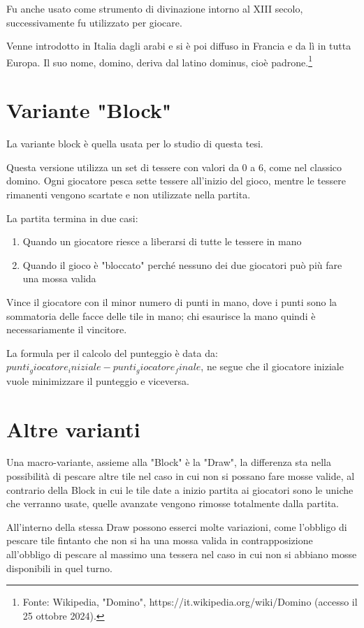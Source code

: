 \documentclass[a4paper.12pt]{report} %
\begin{document}
Fu anche usato come strumento di divinazione intorno al XIII secolo, successivamente fu utilizzato per giocare. 

Venne introdotto in Italia dagli arabi e si è poi diffuso in Francia e da lì in tutta Europa. Il suo nome, domino, deriva dal latino dominus, cioè padrone.\footnote{Fonte: Wikipedia, "Domino", https://it.wikipedia.org/wiki/Domino (accesso il 25 ottobre 2024).}


\section{Variante "Block"}

La variante block è quella usata per lo studio di questa tesi.

Questa versione utilizza un set di tessere con valori da 0 a 6, come nel classico domino. Ogni giocatore pesca sette tessere all'inizio del gioco, mentre le tessere rimanenti vengono scartate e non utilizzate nella partita.

La partita termina in due casi:
\begin{enumerate}
\item Quando un giocatore riesce a liberarsi di tutte le tessere in mano
\item Quando il gioco è "bloccato" perché nessuno dei due giocatori può più fare una mossa valida
\end{enumerate}

Vince il giocatore con il minor numero di punti in mano, dove i punti sono la sommatoria delle facce delle tile in mano; chi esaurisce la mano quindi è necessariamente il vincitore.

La formula per il calcolo del punteggio è data da: $punti_giocatore_iniziale - punti_giocatore_finale$, ne segue che il giocatore iniziale vuole minimizzare il punteggio e viceversa.

\section{Altre varianti}

Una macro-variante, assieme alla "Block" è la "Draw", la differenza sta nella possibilità di pescare altre tile nel caso in cui non si possano fare mosse valide, al contrario della Block in cui le tile date a inizio partita ai giocatori sono le uniche che verranno usate, quelle avanzate vengono rimosse totalmente dalla partita.

All'interno della stessa Draw possono esserci molte variazioni, come l'obbligo di pescare tile fintanto che non si ha una mossa valida in contrapposizione all'obbligo di pescare al massimo una tessera nel caso in cui non si abbiano mosse disponibili in quel turno.
\end{document}
